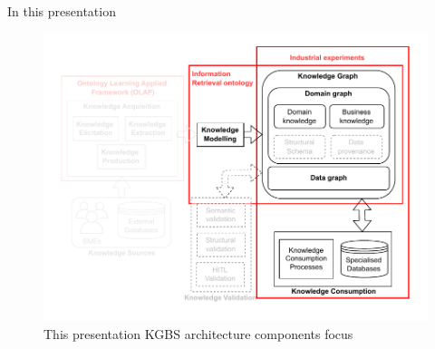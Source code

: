 \begin{frame}{In this presentation}

    \begin{figure} [H]
        \begin{center}
            \includegraphics[scale=0.5]{images/KGBS-architecture-focus-TP-expe-IR-onto.pdf} 
            \caption{This presentation KGBS architecture components focus} 
        \end{center}
    \end{figure}

\end{frame}
